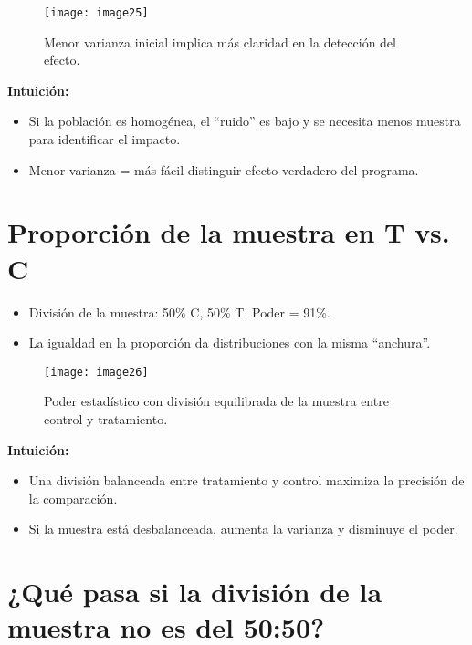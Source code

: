 \documentclass[12pt]{article}
\begin{document}
\begin{figure}[H]
    \centering
    \texttt{[image: image25]}
    \caption{\footnotesize Menor varianza inicial implica más claridad en la detección del efecto.}
\end{figure}

\textbf{Intuición:}
\begin{itemize}
    \item Si la población es homogénea, el “ruido” es bajo y se necesita menos muestra para identificar el impacto.  
    \item Menor varianza = más fácil distinguir efecto verdadero del programa.  
\end{itemize}

\section*{\noindent\textbf{Proporción de la muestra en T vs. C}}

\begin{itemize}
    \item División de la muestra: 50\% C, 50\% T. Poder = 91\%.
    \item La igualdad en la proporción da distribuciones con la misma “anchura”.
\end{itemize}

\begin{figure}[H]
    \centering
    \texttt{[image: image26]}
    \caption{\footnotesize Poder estadístico con división equilibrada de la muestra entre control y tratamiento.}
\end{figure}

\textbf{Intuición:}
\begin{itemize}
    \item Una división balanceada entre tratamiento y control maximiza la precisión de la comparación.  
    \item Si la muestra está desbalanceada, aumenta la varianza y disminuye el poder.  
\end{itemize}

\section*{\noindent\textbf{¿Qué pasa si la división de la muestra no es del 50:50?}}
\end{document}
